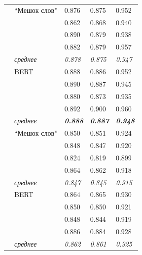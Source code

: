 \begin{table}[H]
\begin{center}
\begin{tabular}{|p{3cm}|p{4cm}|p{2.5cm}|p{2.5cm}|p{2.5cm}|}
			& ``Мешок слов'' & 0.876 & 0.875 & 0.952 \\
				&& 0.862 & 0.868 & 0.940 \\
				&& 0.890 & 0.879 & 0.938 \\
				&& 0.882 & 0.879 & 0.957 \\
				 & \textit{среднее} & \textit{0.878} & \textit{0.875} & \textit{0.947} \\
			& BERT & 0.888 & 0.886 & 0.952 \\
				&& 0.890 & 0.887 & 0.945 \\
				&& 0.880 & 0.873 & 0.935 \\
				&& 0.892 & 0.900 & 0.960 \\
				 & \textit{среднее} & \textbf{\textit{0.888}} & \textbf{\textit{0.887}} & \textbf{\textit{0.948}} \\
			\hline\hline
			
			& ``Мешок слов'' & 0.850 & 0.851 & 0.924 \\
				& & 0.848 & 0.847 & 0.920 \\
				& & 0.824 & 0.819 & 0.899 \\
				& & 0.864 & 0.862 & 0.918 \\
				 & \textit{среднее} & \textit{0.847} & \textit{0.845} & \textit{0.915} \\
			& BERT & 0.864 & 0.865 & 0.930 \\
				& & 0.850 & 0.850 & 0.921 \\
				& & 0.848 & 0.844 & 0.919 \\
				& & 0.886 & 0.884 & 0.928 \\
				 & \textit{среднее} & \textit{0.862} & \textit{0.861} & \textit{0.925} \\
					
			\hline
		\end{tabular}
	\end{center}
\end{table}

